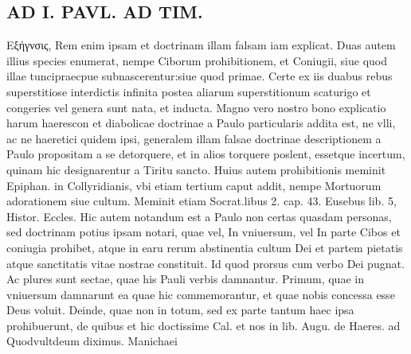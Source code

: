 \documentclass{article}
\begin{document}
\begin{pages}
\section*{AD I. PAVL. AD TIM. }
\marginpar{[ p.400 ]}\pstart Εξήγνσις, Rem enim ipsam et doctrinam illam falsam iam explicat. Duas autem illius species enumerat, nempe Ciborum prohibitionem, et Coniugii, siue quod illae tuncipraecpue subnascerentur:siue quod primae. Certe ex iis duabus rebus superstitiose interdictis infinita postea aliarum superstitionum scaturigo et congeries vel genera sunt nata, et inducta. Magno vero nostro bono explicatio harum haerescon et diabolicae doctrinae a Paulo particularis addita est, ne vlli, ac ne haeretici quidem ipsi, generalem illam falsae doctrinae descriptionem a Paulo propositam a se detorquere, et in alios torquere poslent, essetque incertum, quinam hic designarentur a Tiritu sancto. Huius autem prohibitionis meminit Epiphan. in Collyridianis, vbi etiam tertium caput addit, nempe Mortuorum adorationem siue cultum. Meminit etiam Socrat.libus 2. cap. 43. Eusebus lib. 5, Histor. Eccles. Hic autem notandum est a Paulo non certas quasdam personas, sed doctrinam potius ipsam notari, quae vel, In vniuersum, vel In parte Cibos et coniugia prohibet, atque in earu rerum abstinentia cultum Dei et partem pietatis atque sanctitatis vitae nostrae constituit. Id quod prorsus cum verbo Dei pugnat. Ac plures sunt sectae, quae his Pauli verbis damnantur. Primum, quae in vniuersum damnarunt ea quae hic commemorantur, et quae nobis concessa esse Deus voluit. Deinde, quae non in totum, sed ex parte tantum haec ipsa prohibuerunt, de quibus et hic doctissime Cal. et nos in lib.  Augu. de Haeres. ad Quodvultdeum diximus. Manichaei  \pend

\end{pages}
\end{document}
